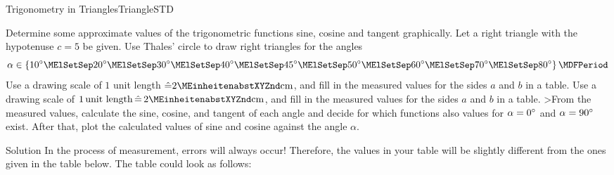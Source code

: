 \begin{MXContent}{Trigonometry in Triangles}{Triangle}{STD}
\begin{MExercise}
Determine some approximate values of the trigonometric functions sine, cosine 
and tangent graphically. Let a right triangle with the hypotenuse $c=5$ be given. 
Use Thales' circle to draw right triangles for the angles
\[ 
\alpha \in \left\{10\MGrad\MElSetSep 20\MGrad\MElSetSep %
30\MGrad\MElSetSep 40\MGrad\MElSetSep 45\MGrad\MElSetSep 50\MGrad\MElSetSep %
60\MGrad\MElSetSep 70\MGrad\MElSetSep 80\MGrad \right\} \MDFPeriod %
\]
\ifttm
Use a drawing scale of $1$ unit length $\hat{=} 2\MEinheit{cm}$, and fill in the 
measured values for the sides $a$ and $b$ in a table. 
\else
Use a drawing scale of $1\,\text{unit length} \,\hat{=}\, 2\MEinheit{cm}$, and fill in the 
measured values for the sides $a$ and $b$ in a table. 
\fi
>From the measured values, calculate the sine, cosine, and tangent of each angle
and decide for which functions also values for $\alpha = 0^{\circ}$ 
and $\alpha = 90^{\circ}$ exist. After that, plot the calculated values of sine 
and cosine against the angle $\alpha$.

\begin{MHint}{Solution}
In the process of measurement, errors will always occur! Therefore, the 
values in your table will be slightly different from the ones given in 
the table below. The table could look as follows:


\end{MHint}
\end{MExercise}
\end{MXContent}
